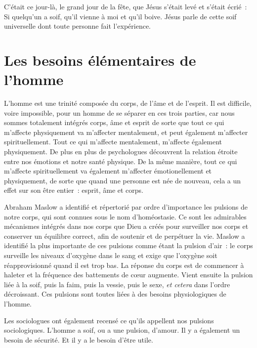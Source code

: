 C'était ce jour-là, le grand jour de la fête, que Jésus s'était levé
 et s'était écrié~:
 \og Si quelqu'un a soif, qu'il vienne à moi et qu'il boive. \fg{}
 Jésus parle de cette soif universelle dont toute personne fait l'expérience.


\section{Les besoins \'el\'ementaires de l'homme}


L'homme est une trinité composée du corps, de l'âme et de l'esprit.
 Il est difficile, voire impossible, pour un homme de se séparer
 en ces trois parties, car nous sommes totalement intégrés
 \ocadr corps, âme et esprit \fcadr{} de sorte
 que tout ce qui m'affecte
 physiquement va m'affecter mentalement, et peut également m'affecter
 spirituellement. Tout ce qui m'affecte mentalement, m'affecte
 également physiquement.
 De plus en plus de psychologues découvrent la relation étroite
 entre nos émotions et notre santé physique.
 De la même manière, tout ce qui m'affecte spirituellement
 va également m'affecter émotionellement et physiquement,
 de sorte que quand une personne est née de nouveau,
 cela a un effet sur son être entier~: esprit, âme et corps.

Abraham Maslow a identifié et répertorié par ordre d'importance
 les pulsions de notre corps, qui sont connues sous le nom d'homéo\-stasie.
 Ce sont les admirables mécanismes intégrés dans nos corps que Dieu
 a créés pour surveiller nos corps et conserver un équilibre correct,
 afin de soutenir et de perpétuer la vie.
 Maslow a identifié la plus importante de ces pulsions comme étant
 la pulsion d'air~: le corps surveille les niveaux d'oxygène dans le sang
 et exige que l'oxygène soit réapprovisionné quand il est trop bas.
 La réponse du corps est de commencer à haleter et la fréquence
 des battements de cœur augmente.
 Vient ensuite la pulsion liée à la soif, puis la faim, puis la vessie,
 puis le sexe, \emph{et cetera} dans l'ordre décroissant.
 Ces pulsions sont toutes liées à des besoins physiologiques de l'homme.

Les sociologues ont également recensé ce qu'ils appellent nos pulsions
 sociologiques. L'homme a soif, ou a une pulsion, d'amour.
 Il y a également un besoin de sécurité. Et il y a le besoin d'être utile.


